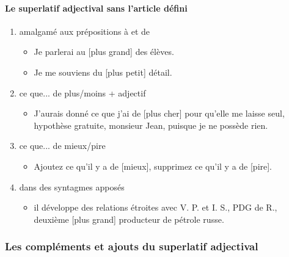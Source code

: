 \documentclass[UTF8]{report}
\begin{document}
\paragraph{Le superlatif adjectival sans l’article défini}
\begin{enumerate}
    \item amalgamé aux prépositions à et de
    \begin{itemize}
        \item Je parlerai au [plus grand] des élèves.
        \item Je me souviens du [plus petit] détail.
    \end{itemize}
    \item ce que... de plus/moins + adjectif 
    \begin{itemize}
        \item J’aurais donné ce que j’ai de [plus cher] pour qu’elle me laisse seul, hypothèse gratuite, monsieur Jean, puisque je ne possède rien. 
    \end{itemize}
    \item ce que... de mieux/pire
    \begin{itemize}
        \item Ajoutez ce qu'il y a de [mieux], supprimez ce qu'il y a de [pire].
    \end{itemize}
    \item dans des syntagmes apposés
    \begin{itemize}
        \item il développe des relations étroites avec V. P. et I. S., PDG de R., deuxième [plus grand] producteur de pétrole russe.
    \end{itemize}
\end{enumerate}

\subsubsection{Les compléments et ajouts du superlatif adjectival}
\end{document}
